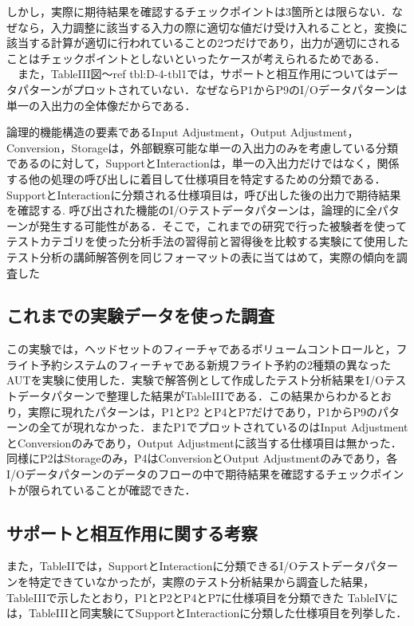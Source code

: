 \documentclass[a4paper,12pt]{jreport}
\begin{document}
しかし，実際に期待結果を確認するチェックポイントは3箇所とは限らない．なぜなら，入力調整に該当する入力の際に適切な値だけ受け入れることと，変換に該当する計算が適切に行われていることの2つだけであり，出力が適切にされることはチェックポイントとしないといったケースが考えられるためである．
　また，TableIII図〜ref {tbl:D-4-tbl1}では，サポートと相互作用についてはデータパターンがプロットされていない．なぜならP1からP9のI/Oデータパターンは単一の入出力の全体像だからである．


論理的機能構造の要素であるInput Adjustment，Output Adjustment，Conversion，Storageは，外部観察可能な単一の入出力のみを考慮している分類であるのに対して，SupportとInteractionは，単一の入出力だけではなく，関係する他の処理の呼び出しに着目して仕様項目を特定するための分類である．
SupportとInteractionに分類される仕様項目は，呼び出した後の出力で期待結果を確認する. 呼び出された機能のI/Oテストデータパターンは，論理的に全パターンが発生する可能性がある．そこで，これまでの研究で行った被験者を使ってテストカテゴリを使った分析手法の習得前と習得後を比較する実験にて使用したテスト分析の講師解答例を同じフォーマットの表に当てはめて，実際の傾向を調査した

\subsection{これまでの実験データを使った調査}
この実験では，ヘッドセットのフィーチャであるボリュームコントロールと，フライト予約システムのフィーチャである新規フライト予約の2種類の異なったAUTを実験に使用した．実験で解答例として作成したテスト分析結果をI/Oテストデータパターンで整理した結果がTableIIIである．この結果からわかるとおり，実際に現れたパターンは，P1とP2 とP4とP7だけであり，P1からP9のパターンの全てが現れなかった．またP1でプロットされているのはInput AdjustmentとConversionのみであり，Output Adjustmentに該当する仕様項目は無かった．同様にP2はStorageのみ，P4はConversionとOutput Adjustmentのみであり，各I/Oデータパターンのデータのフローの中で期待結果を確認するチェックポイントが限られていることが確認できた．

\subsection{サポートと相互作用に関する考察}
また，TableIIでは，SupportとInteractionに分類できるI/Oテストデータパターンを特定できていなかったが，実際のテスト分析結果から調査した結果，
TableIIIで示したとおり，P1とP2とP4とP7に仕様項目を分類できた
TableIVには，TableIIIと同実験にてSupportとInteractionに分類した仕様項目を列挙した．
\end{document}
